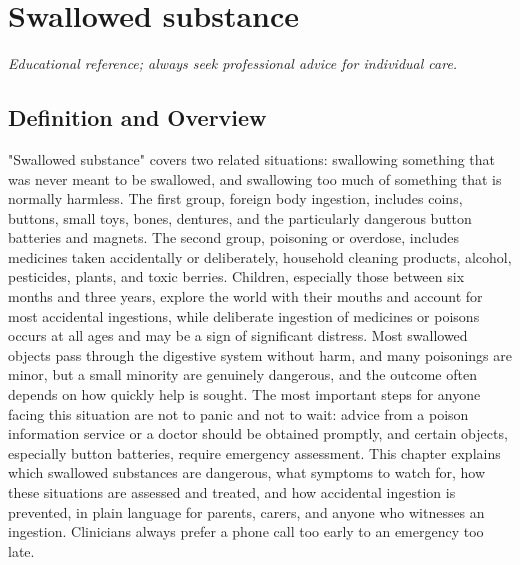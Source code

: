 \chapter{Swallowed substance}

\medskip
\noindent\textit{Educational reference; always seek professional advice for individual care.}

\section*{Definition and Overview}
"Swallowed substance" covers two related situations: swallowing something that was never meant to be swallowed, and swallowing too much of something that is normally harmless. The first group, foreign body ingestion, includes coins, buttons, small toys, bones, dentures, and the particularly dangerous button batteries and magnets. The second group, poisoning or overdose, includes medicines taken accidentally or deliberately, household cleaning products, alcohol, pesticides, plants, and toxic berries. Children, especially those between six months and three years, explore the world with their mouths and account for most accidental ingestions, while deliberate ingestion of medicines or poisons occurs at all ages and may be a sign of significant distress. Most swallowed objects pass through the digestive system without harm, and many poisonings are minor, but a small minority are genuinely dangerous, and the outcome often depends on how quickly help is sought. The most important steps for anyone facing this situation are not to panic and not to wait: advice from a poison information service or a doctor should be obtained promptly, and certain objects, especially button batteries, require emergency assessment. This chapter explains which swallowed substances are dangerous, what symptoms to watch for, how these situations are assessed and treated, and how accidental ingestion is prevented, in plain language for parents, carers, and anyone who witnesses an ingestion. Clinicians always prefer a phone call too early to an emergency too late.

